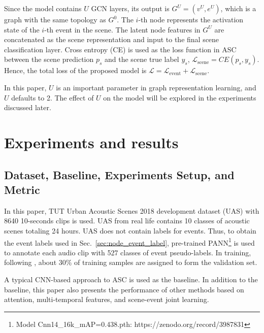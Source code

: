 \documentclass{article}
\begin{document}
Since the model contains $U$ GCN layers, its output is $G^U=(v^U,e^U)$, which is a graph with the same topology as $G^0$.  
The $i$-th node represents the activation state of the $i$-th event in the scene. The latent node features in $G^U$ are concatenated as the scene representation and input to the final scene classification layer.
Cross entropy (CE) is used as the loss function in ASC between the scene prediction $p_{s}$ and the scene true label ${y}_{s}$,
$\mathcal{L}_\text{scene} = CE(p_{s}, y_{s})$. 
Hence, the total loss of the proposed model is $\mathcal{L} = \mathcal{L}_\text{event} + \mathcal{L}_\text{scene}$. 




In this paper, $U$ is an important parameter in graph representation learning, and $U$ defaults to 2. The effect of $U$ on the model will be explored in the experiments discussed later.


\vspace{-0.2cm}
\section{Experiments and results}
\label{sec:experiments}

\vspace{-0.2cm}
\subsection{Dataset, Baseline, Experiments Setup, and Metric}


In this paper, TUT Urban Acoustic Scenes 2018 development dataset (UAS) \cite{DCASE2018} with 8640 10-seconds clips is used. 
UAS from real life contains 10 classes of acoustic scenes totaling 24 hours. 
UAS does not contain labels for events. 
Thus, to obtain the event labels used in Sec.~\ref{sec:node_event_label}, pre-trained PANN\protect\footnote{Model Cnn14\_16k\_mAP=0.438.pth: https://zenodo.org/record/3987831} \cite{kong2020panns} is used to annotate each audio clip with 527 classes of event pseudo-labels.
In training, following \cite{DCASE2018}, 
about 30\% of training samples are assigned to form the validation set.

 

A typical CNN-based approach \cite{DCASE2018} to ASC is used as the baseline. 
In addition to the baseline, this paper also presents the performance of other methods based on attention, multi-temporal features, and scene-event joint learning.

 
 
\end{document}
